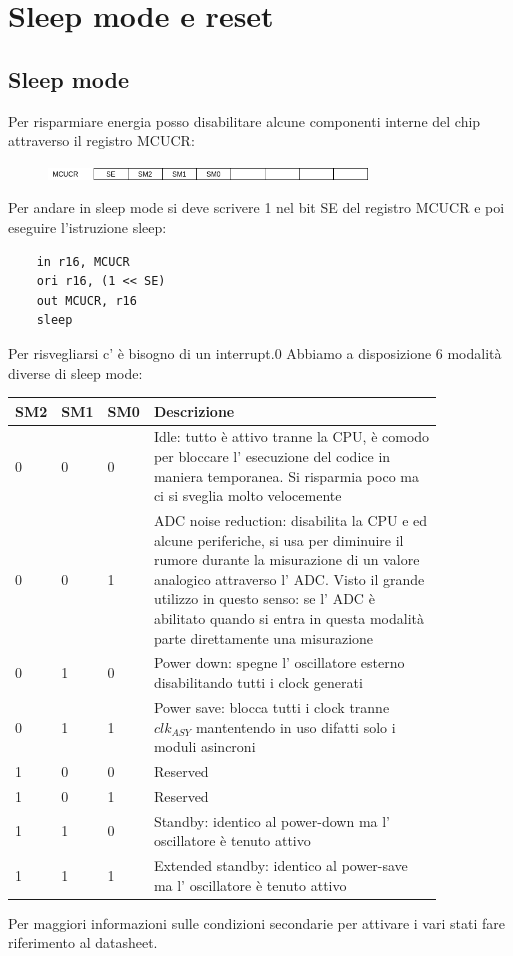 \section{Sleep mode e reset}
\subsection{Sleep mode}
Per risparmiare energia posso disabilitare alcune componenti interne del chip attraverso il registro MCUCR:
\begin{figure}[H]
    \centering
    \includegraphics[width=320px]{images/16_Sleep_mode/MCUCR.png}
\end{figure}
Per andare in sleep mode si deve scrivere 1 nel bit SE del registro MCUCR e poi eseguire l'istruzione sleep:
\begin{verbatim}
    in r16, MCUCR
    ori r16, (1 << SE)
    out MCUCR, r16
    sleep
\end{verbatim}
Per risvegliarsi c' è bisogno di un interrupt.0
Abbiamo a disposizione 6 modalità diverse di sleep mode:
\begin{table}[H]
    \centering
    \begin{tabular}{p{0.05\linewidth} p{0.05\linewidth} p{0.05\linewidth} | p{0.7\linewidth}}
        SM2 & SM1 & SM0 & Descrizione \\
        \hline
        0 & 0 & 0 & Idle: tutto è attivo tranne la CPU, è comodo per bloccare l' esecuzione del codice in maniera temporanea. Si risparmia poco ma ci si sveglia molto velocemente \\
        \hline
        0 & 0 & 1 & ADC noise reduction: disabilita la CPU e ed alcune periferiche, si usa per diminuire il rumore durante la misurazione di un valore analogico attraverso l' ADC. Visto il grande utilizzo in questo senso: se l' ADC è abilitato quando si entra in questa modalità parte direttamente una misurazione \\
        \hline
        0 & 1 & 0 & Power down: spegne l' oscillatore esterno disabilitando tutti i clock generati \\
        \hline
        0 & 1 & 1 & Power save: blocca tutti i clock tranne $clk_{ASY}$ mantentendo in uso difatti solo i moduli asincroni \\
        \hline
        1 & 0 & 0 & Reserved \\
        \hline
        1 & 0 & 1 & Reserved \\
        \hline
        1 & 1 & 0 & Standby: identico al power-down ma l' oscillatore è tenuto attivo \\
        \hline
        1 & 1 & 1 & Extended standby: identico al power-save ma l' oscillatore è tenuto attivo \\
    \end{tabular}
\end{table}
Per maggiori informazioni sulle condizioni secondarie per attivare i vari stati fare riferimento al datasheet.



